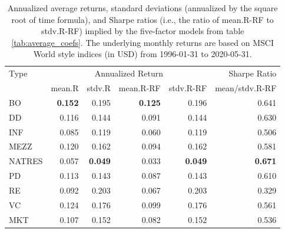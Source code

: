 \documentclass[12pt]{article}
\begin{document}
\begin{table}[ht]
	\centering
	\begin{tabular}{lrrrrr}
		Type & \multicolumn{4}{c}{Annualized Return} & Sharpe Ratio \\ 
		\cmidrule(r){2-5}
		& mean.R & stdv.R & mean.R-RF & stdv.R-RF & mean/stdv.R-RF \\ 
		\hline
		\hline
		BO & \textbf{0.152} & 0.195 & \textbf{0.125} & 0.196 & 0.641 \\ 
		DD & 0.116 & 0.144 & 0.091 & 0.144 & 0.630 \\ 
		INF & 0.085 & 0.119 & 0.060 & 0.119 & 0.506 \\ 
		MEZZ & 0.120 & 0.162 & 0.094 & 0.162 & 0.581 \\ 
		NATRES & 0.057 & \textbf{0.049} & 0.033 & \textbf{0.049} & \textbf{0.671} \\ 
		PD & 0.113 & 0.143 & 0.087 & 0.143 & 0.610 \\ 
		RE & 0.092 & 0.203 & 0.067 & 0.203 & 0.329 \\ 
		VC & 0.124 & 0.176 & 0.099 & 0.176 & 0.561 \\ 
		\hline
		MKT & 0.107 & 0.152 & 0.082 & 0.152 & 0.536 \\ 
		\hline
		\hline
	\end{tabular}
	\caption{Annualized average returns, standard deviations (annualized by the square root of time formula), and Sharpe ratios (i.e., the ratio of mean.R-RF to stdv.R-RF) implied by the five-factor models from table \ref{tab:average_coefs}. 
		The underlying monthly returns are based on MSCI World style indices (in USD) from 1996-01-31 to 2020-05-31.
	} 
	\label{tab:ann_returns}
\end{table}
\end{document}
